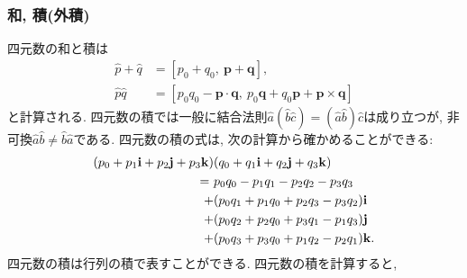 \subsubsection{和, 積(外積)}
四元数の和と積は
\begin{align}
 \hat{p} + \hat{q} &= [p_{0} + q_{0},~ \mathbf{p} + \mathbf{q}], \\
 \hat{p} \hat{q}   &= [p_{0} q_{0} - \mathbf{p} \cdot \mathbf{q},~ 
                       p_{0}\mathbf{q} + q_{0}\mathbf{p} + \mathbf{p} \times \mathbf{q}]
\end{align}
と計算される. 
四元数の積では一般に結合法則$\hat{a}(\hat{b}\hat{c}) = (\hat{a}\hat{b})\hat{c}$は成り立つが, 非可換$\hat{a}\hat{b} \neq \hat{b}\hat{a}$である. 
四元数の積の式は, 次の計算から確かめることができる:
\begin{align}
 (p_{0} + p_{1} \mathbf{i} + p_{2} \mathbf{j} + p_{3} \mathbf{k})&
 (q_{0} + q_{1} \mathbf{i} + q_{2} \mathbf{j} + q_{3} \mathbf{k})
 \notag \\
 ~=~
   & p_{0} q_{0} - p_{1} q_{1} - p_{2} q_{2} - p_{3} q_{3}  \notag \\
 + &(p_{0} q_{1} + p_{1} q_{0} + p_{2} q_{3} - p_{3} q_{2}) \mathbf{i} \notag \\
 + &(p_{0} q_{2} + p_{2} q_{0} + p_{3} q_{1} - p_{1} q_{3}) \mathbf{j} \notag \\
 + &(p_{0} q_{3} + p_{3} q_{0} + p_{1} q_{2} - p_{2} q_{1}) \mathbf{k}.
\end{align}
四元数の積は行列の積で表すことができる.
四元数の積を計算すると,

